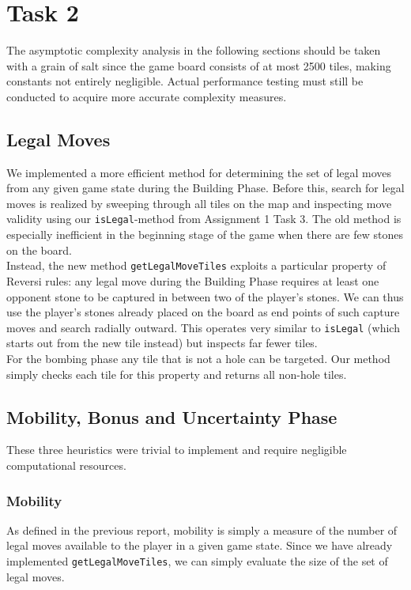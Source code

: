 \documentclass[a4paper,12pt]{article}
\begin{document}
    \section{Task 2}
    The asymptotic complexity analysis in the following sections should be taken with a grain of salt since the game board consists of at most 2500 tiles, making constants not entirely negligible. Actual performance testing must still be conducted to acquire more accurate complexity measures.    
    \subsection{Legal Moves}
    We implemented a more efficient method for determining the set of legal moves from any given game state during the Building Phase. Before this, search for legal moves is realized by sweeping through all tiles on the map and inspecting move validity using our \lstinline{isLegal}-method from Assignment 1 Task 3. The old method is especially inefficient in the beginning stage of the game when there are few stones on the board.\\ Instead, the new method \lstinline{getLegalMoveTiles} exploits a particular property of Reversi rules: any legal move during the Building Phase requires at least one opponent stone to be captured in between two of the player's stones. We can thus use the player's stones already placed on the board as end points of such capture moves and search radially outward. This operates very similar to \lstinline{isLegal} (which starts out from the new tile instead) but inspects far fewer tiles.\\
    For the bombing phase any tile that is not a hole can be targeted. Our method simply checks each tile for this property and returns all non-hole tiles. 
    
    \subsection{Mobility, Bonus and Uncertainty Phase}
    These three heuristics were trivial to implement and require negligible computational resources. 
    \subsubsection{Mobility}
    As defined in the previous report, mobility is simply a measure of the number of legal moves available to the player in a given game state. Since we have already implemented \lstinline{getLegalMoveTiles}, we can simply evaluate the size of the set of legal moves. 
    
\end{document}
